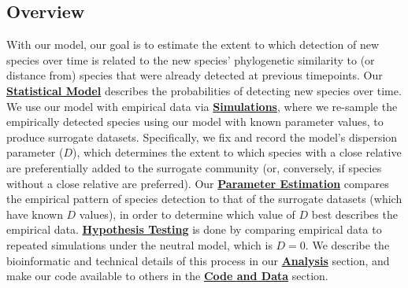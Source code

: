 \documentclass{article}
\begin{document}
\subsection{Overview} \label{sec:overview}
With our model, our goal is to estimate the extent to which detection of new species over time is related to the new species' phylogenetic similarity to (or distance from) species that were already detected at previous timepoints. Our \hyperref[sec:statisticalModel]{\textbf{Statistical Model}} describes the probabilities of detecting new species over time. We use our model with empirical data via \hyperref[sec:simulations]{\textbf{Simulations}}, where we re-sample the empirically detected species using our model with known parameter values, to produce surrogate datasets. Specifically, we fix and record the model’s dispersion parameter (\(D\)), which determines the extent to which species with a close relative are preferentially added to the surrogate community (or, conversely, if species without a close relative are preferred). Our \hyperref[sec:parameterEstimation]{\textbf{Parameter Estimation}} compares the empirical pattern of species detection to that of the surrogate datasets (which have known \(D\) values), in order to determine which value of \(D\) best describes the empirical data. \hyperref[sec:hypothesisTesting]{\textbf{Hypothesis Testing}} is done by comparing empirical data to repeated simulations under the neutral model, which is \(D=0\). We describe the bioinformatic and technical details of this process in our \hyperref[sec:analysis]{\textbf{Analysis}} section, and make our code available to others in the \hyperref[sec:codeAndData]{\textbf{Code and Data}} section.
\end{document}
